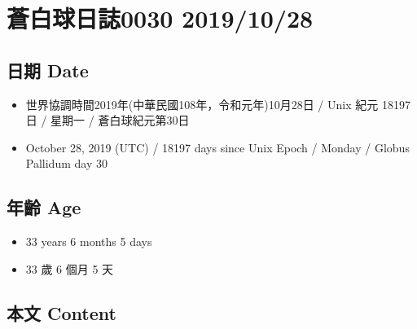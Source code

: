 \documentclass[
]{article}
\providecommand{\tightlist}{%
  \setlength{\itemsep}{0pt}\setlength{\parskip}{0pt}}
\begin{document}
\hypertarget{ux84bcux767dux7403ux65e5ux8a8c0030-20191028}{%
\section{蒼白球日誌0030
2019/10/28}\label{ux84bcux767dux7403ux65e5ux8a8c0030-20191028}}

\hypertarget{ux65e5ux671f-date-27}{%
\subsection{日期 Date}\label{ux65e5ux671f-date-27}}

\begin{itemize}
\tightlist
\item
  世界協調時間2019年(中華民國108年，令和元年)10月28日 / Unix 紀元 18197
  日 / 星期一 / 蒼白球紀元第30日
\item
  October 28, 2019 (UTC) / 18197 days since Unix Epoch / Monday / Globus
  Pallidum day 30
\end{itemize}

\hypertarget{ux5e74ux9f61-age-27}{%
\subsection{年齡 Age}\label{ux5e74ux9f61-age-27}}

\begin{itemize}
\tightlist
\item
  33 years 6 months 5 days
\item
  33 歲 6 個月 5 天
\end{itemize}

\hypertarget{ux672cux6587-content-27}{%
\subsection{本文 Content}\label{ux672cux6587-content-27}}
\end{document}
